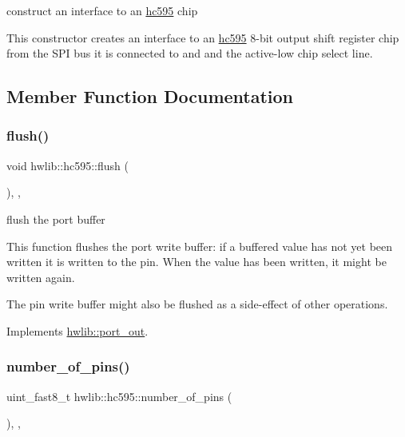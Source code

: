 construct an interface to an \hyperlink{classhwlib_1_1hc595}{hc595} chip

This constructor creates an interface to an \hyperlink{classhwlib_1_1hc595}{hc595} 8-\/bit output shift register chip from the S\+PI bus it is connected to and and the active-\/low chip select line. 

\subsection{Member Function Documentation}
\mbox{\label{classhwlib_1_1hc595_a89801264883c79926fd9f0983662e50a}} 
\subsubsection{\texorpdfstring{flush()}{flush()}}
{\footnotesize\ttfamily void hwlib\+::hc595\+::flush (\begin{DoxyParamCaption}{ }\end{DoxyParamCaption})\hspace{0.3cm}{\ttfamily [inline]}, {\ttfamily [override]}, {\ttfamily [virtual]}}





flush the port buffer

This function flushes the port write buffer\+: if a buffered value has not yet been written it is written to the pin. When the value has been written, it might be written again.

The pin write buffer might also be flushed as a side-\/effect of other operations. 

Implements \hyperlink{classhwlib_1_1port__out_aff7c8d768ec0b7f3d738a47ef1a4bbfe}{hwlib\+::port\+\_\+out}.

\mbox{\label{classhwlib_1_1hc595_a89c7b21cb99d61c91f764a0fdb7ceb9b}} 
\subsubsection{\texorpdfstring{number\+\_\+of\+\_\+pins()}{number\_of\_pins()}}
{\footnotesize\ttfamily uint\+\_\+fast8\+\_\+t hwlib\+::hc595\+::number\+\_\+of\+\_\+pins (\begin{DoxyParamCaption}{ }\end{DoxyParamCaption})\hspace{0.3cm}{\ttfamily [inline]}, {\ttfamily [override]}, {\ttfamily [virtual]}}





